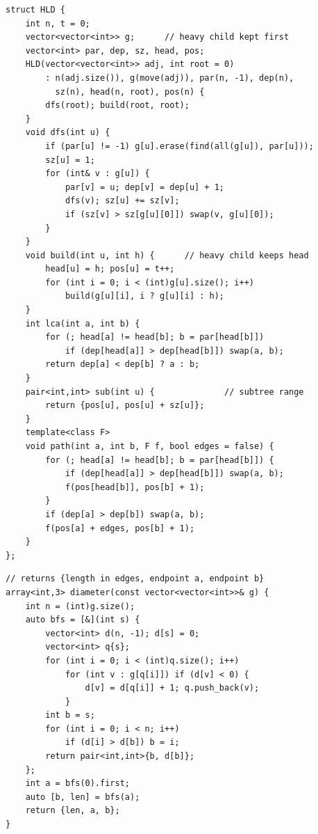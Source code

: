\begin{lstlisting}
struct HLD {
    int n, t = 0;
    vector<vector<int>> g;      // heavy child kept first
    vector<int> par, dep, sz, head, pos;
    HLD(vector<vector<int>> adj, int root = 0)
        : n(adj.size()), g(move(adj)), par(n, -1), dep(n),
          sz(n), head(n, root), pos(n) {
        dfs(root); build(root, root);
    }
    void dfs(int u) {
        if (par[u] != -1) g[u].erase(find(all(g[u]), par[u]));
        sz[u] = 1;
        for (int& v : g[u]) {
            par[v] = u; dep[v] = dep[u] + 1;
            dfs(v); sz[u] += sz[v];
            if (sz[v] > sz[g[u][0]]) swap(v, g[u][0]);
        }
    }
    void build(int u, int h) {      // heavy child keeps head
        head[u] = h; pos[u] = t++;
        for (int i = 0; i < (int)g[u].size(); i++)
            build(g[u][i], i ? g[u][i] : h);
    }
    int lca(int a, int b) {
        for (; head[a] != head[b]; b = par[head[b]])
            if (dep[head[a]] > dep[head[b]]) swap(a, b);
        return dep[a] < dep[b] ? a : b;
    }
    pair<int,int> sub(int u) {              // subtree range
        return {pos[u], pos[u] + sz[u]};
    }
    template<class F>
    void path(int a, int b, F f, bool edges = false) {
        for (; head[a] != head[b]; b = par[head[b]]) {
            if (dep[head[a]] > dep[head[b]]) swap(a, b);
            f(pos[head[b]], pos[b] + 1);
        }
        if (dep[a] > dep[b]) swap(a, b);
        f(pos[a] + edges, pos[b] + 1);
    }
};
\end{lstlisting}


\begin{lstlisting}
// returns {length in edges, endpoint a, endpoint b}
array<int,3> diameter(const vector<vector<int>>& g) {
    int n = (int)g.size();
    auto bfs = [&](int s) {
        vector<int> d(n, -1); d[s] = 0;
        vector<int> q{s};
        for (int i = 0; i < (int)q.size(); i++)
            for (int v : g[q[i]]) if (d[v] < 0) {
                d[v] = d[q[i]] + 1; q.push_back(v);
            }
        int b = s;
        for (int i = 0; i < n; i++)
            if (d[i] > d[b]) b = i;
        return pair<int,int>{b, d[b]};
    };
    int a = bfs(0).first;
    auto [b, len] = bfs(a);
    return {len, a, b};
}
\end{lstlisting}

